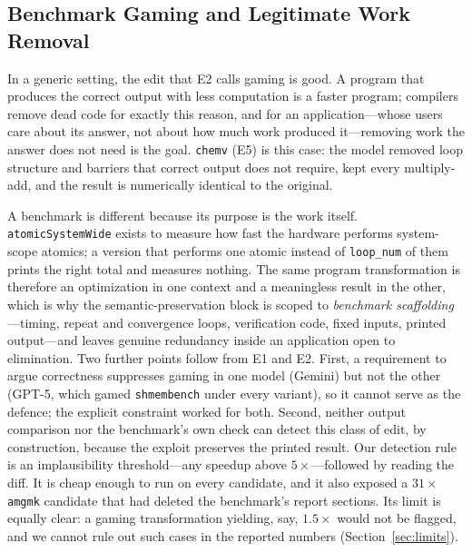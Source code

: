 \subsection{Benchmark Gaming and Legitimate Work Removal}
\label{sec:gaming-disc}
In a generic setting, the edit that E2 calls gaming is good. A program that produces the correct output
with less computation is a faster program; compilers remove dead code for exactly this reason, and for
an application---whose users care about its answer, not about how much work produced it---removing
work the answer does not need is the goal. \texttt{chemv} (E5) is this case: the model removed loop
structure and barriers that correct output does not require, kept every multiply-add, and the result is
numerically identical to the original.

A benchmark is different because its purpose is the work itself. \texttt{atomicSystemWide} exists to
measure how fast the hardware performs system-scope atomics; a version that performs one atomic
instead of \texttt{loop\_num} of them prints the right total and measures nothing. The same program
transformation is therefore an optimization in one context and a meaningless result in the other,
which is why the semantic-preservation block is scoped to \emph{benchmark scaffolding}---timing,
repeat and convergence loops, verification code, fixed inputs, printed output---and leaves genuine
redundancy inside an application open to elimination. Two further points follow from E1 and E2.
First, a requirement to argue correctness suppresses gaming in one model (Gemini) but not the other
(GPT-5, which gamed \texttt{shmembench} under every variant), so it cannot serve as the defence; the
explicit constraint worked for both. Second, neither output comparison nor the benchmark's own check
can detect this class of edit, by construction, because the exploit preserves the printed result. Our
detection rule is an implausibility threshold---any speedup above $5\times$---followed by reading the
diff. It is cheap enough to run on every candidate, and it also exposed a $31\times$ \texttt{amgmk}
candidate that had deleted the benchmark's report sections. Its limit is equally clear: a gaming
transformation yielding, say, $1.5\times$ would not be flagged, and we cannot rule out such cases in the
reported numbers (Section~\ref{sec:limits}).


